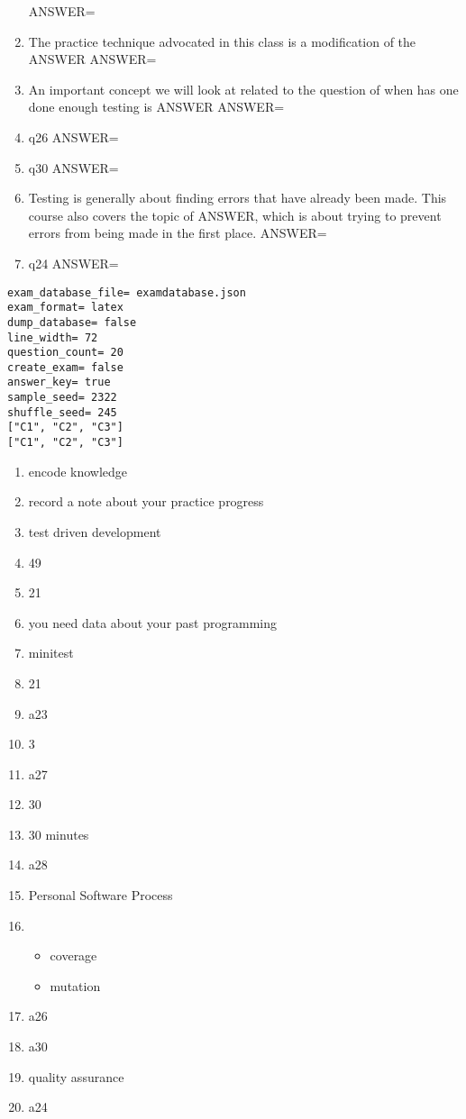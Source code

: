 \documentclass{exam}
\begin{document}
\begin{enumerate}
ANSWER=
\item The practice technique advocated in this class is a modification of the ANSWER\newline
ANSWER=
\item An important concept we will look at related to the question of when has one done enough testing is ANSWER\newline
ANSWER=
\item q26\newline
ANSWER=
\item q30\newline
ANSWER=
\item Testing is generally about finding errors that have already been made.  This course also covers the topic of ANSWER, which is about trying to prevent errors from being made in the first place.\newline
ANSWER=
\item q24\newline
ANSWER=
\end{enumerate}
\newpage
\begin{verbatim}
exam_database_file= examdatabase.json
exam_format= latex
dump_database= false
line_width= 72
question_count= 20
create_exam= false
answer_key= true
sample_seed= 2322
shuffle_seed= 245
["C1", "C2", "C3"]
["C1", "C2", "C3"]
\end{verbatim}
\begin{enumerate}
\item encode knowledge
\item record a note about your practice progress
\item test driven development
\item 49
\item 21
\item you need data about your past programming
\item minitest
\item 21
\item a23
\item 3
\item a27
\item 30
\item 30 minutes
\item a28
\item Personal Software Process
\item \begin{itemize}
\item coverage
\item mutation
\end{itemize}
\item a26
\item a30
\item quality assurance
\item a24
\end{enumerate}
\end{document}
